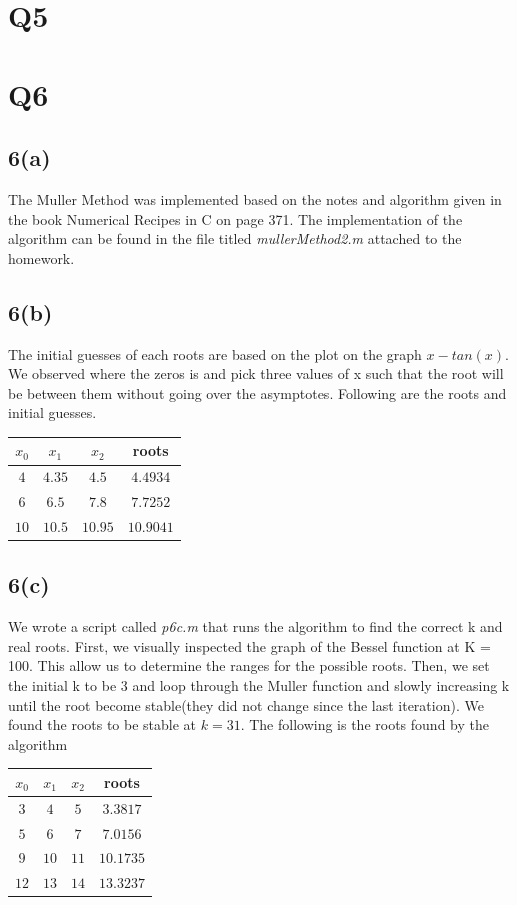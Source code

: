 \documentclass{article}
\begin{document}
\section{Q5}
\section{Q6}
\subsection{6(a)}
The Muller Method was implemented based on the notes and algorithm given in the book Numerical Recipes in C on page 371. The implementation of the algorithm can be found in the file titled \textit{mullerMethod2.m} attached to the homework.
\subsection{6(b)}
The initial guesses of each roots are based on the plot on the graph $x -tan(x)$. We observed where the zeros is and pick three values of x such that the root will be between them without going over the asymptotes. Following are the roots and initial guesses.\\

\begin{tabular}{|c|c|c|c|}
\hline
$x_0$ & $x_1$ & $x_2$ & roots \\ \hline
$4$ & $4.35$ & $4.5$ & $4.4934$ \\ \hline
$6$ & $6.5$ & $7.8$ & $7.7252$ \\ \hline
$10$ & $10.5$ & $10.95$ & $10.9041$ \\ \hline
\end{tabular}
\subsection{6(c)}
We wrote a script called \textit{p6c.m} that runs the algorithm to find the correct k and real roots. First, we visually inspected the graph of the Bessel function at K = 100. This allow us to determine the ranges for the possible roots. Then, we set the initial k to be 3 and loop through the Muller function and slowly increasing k until the root become stable(they did not change since the last iteration). We found the roots to be stable at $k = 31$. The following is the roots found by the algorithm\\

\begin{tabular}{|c|c|c|c|}
\hline
$x_0$ & $x_1$ & $x_2$ & roots \\ \hline
$3$ & $4$ & $5$ & $3.3817$ \\ \hline
$5$ & $6$ & $7$ & $7.0156$ \\ \hline
$9$ & $10$ & $11$ & $10.1735$ \\ \hline
$12$ & $13$ & $14$ & $13.3237$ \\ \hline
\end{tabular}
\end{document}
